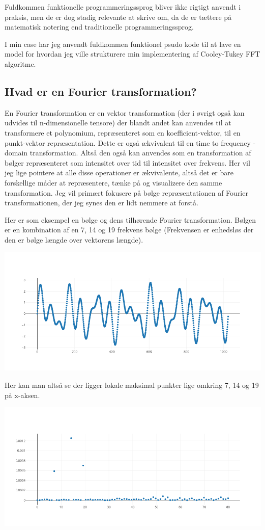 \documentclass[11pt,a4paper]{article}
\begin{document}
Fuldkommen funktionelle programmeringssprog bliver ikke rigtigt anvendt i praksis,
men de er dog stadig relevante at skrive om, da de er tættere på matematisk notering
end traditionelle programmeringssprog.

I min case har jeg anvendt fuldkommen funktionel psudo kode til at lave en model
for hvordan jeg ville strukturere min implementering af Cooley-Tukey FFT algoritme.

\subsection{Hvad er en Fourier transformation?}
\label{sec:orgf36c516}
\newpage

En Fourier transformation er en vektor transformation (der i øvrigt også kan udvides til n-dimensionelle tensore)
der blandt andet kan anvendes til at transformere et polynomium,
repræsenteret som en koefficient-vektor, til en punkt-vektor repræsentation.
Dette er også ækvivalent til en time to frequency -domain transformation.
Altså den også kan anvendes som en transformation af bølger repræsenteret som intensitet over tid til intensitet over frekvens.
Her vil jeg lige pointere at alle disse operationer er ækvivalente, altså det er bare forskellige måder at repræsentere, tænke på og visualizere den samme transformation.
Jeg vil primært fokusere på bølge repræsentationen af Fourier transformationen, der jeg synes den er lidt nemmere at forstå.

Her er som eksempel en bølge og dens tilhørende Fourier transformation.
Bølgen er en kombination af en 7, 14 og 19 frekvens bølge (Frekvensen er enhedsløs der den er bølge længde over vektorens længde).

\begin{center}
\includegraphics[width=.9\linewidth]{./source_plot2.png}
\end{center}

Her kan man altså se der ligger lokale maksimal punkter lige omkring 7, 14 og 19 på x-aksen.
\begin{center}
\includegraphics[width=.9\linewidth]{./plot2.png}
\end{center}
\end{document}
